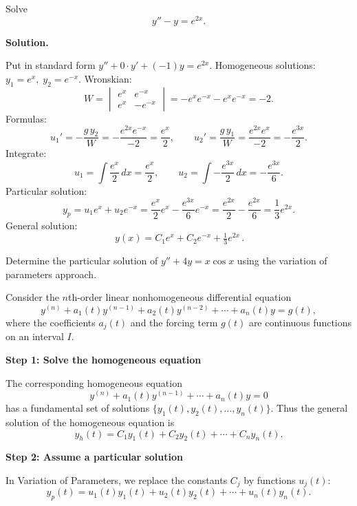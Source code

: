     \begin{example}

      Solve
      \[
        y''-y=e^{2x}.
      \]

      \textbf{Solution.} 
      
      Put in standard form $y''+0\cdot y'+(-1)y=e^{2x}$. Homogeneous solutions:
      $y_1=e^x,\; y_2=e^{-x}$. Wronskian:
      \[
        W=\begin{vmatrix}e^x & e^{-x}\\ e^x & -e^{-x}\end{vmatrix} = -e^x e^{-x} - e^x e^{-x} = -2.
      \]
      Formulas:
      \[
        u_1' = -\frac{g\,y_2}{W} = -\frac{e^{2x}e^{-x}}{-2} = \frac{e^x}{2},\qquad
        u_2' = \frac{g\,y_1}{W} = \frac{e^{2x}e^{x}}{-2} = -\frac{e^{3x}}{2}.
      \]
      Integrate:
      \[
        u_1 = \int \frac{e^x}{2}\,dx = \frac{e^x}{2},\qquad
        u_2 = \int -\frac{e^{3x}}{2}\,dx = -\frac{e^{3x}}{6}.
      \]
      Particular solution:
      \[
        y_p = u_1 e^x + u_2 e^{-x} = \frac{e^x}{2}e^x - \frac{e^{3x}}{6}e^{-x}
        = \frac{e^{2x}}{2} - \frac{e^{2x}}{6} = \frac{1}{3}e^{2x}.
      \]
      General solution:
      \[
        \boxed{\,y(x)=C_1 e^{x}+C_2 e^{-x} + \tfrac{1}{3}e^{2x}\,.}
      \]
    \end{example}


    \begin{example}
      Determine the particular solution of \(y'' + 4y = x\cos{x}\) using the variation of parameters approach.
    \end{example}


  Consider the $n$th-order linear nonhomogeneous differential equation
  \[
    y^{(n)} + a_{1}(t)y^{(n-1)} + a_{2}(t)y^{(n-2)} + \cdots + a_{n}(t)y = g(t),
  \]
  where the coefficients $a_{j}(t)$ and the forcing term $g(t)$ are continuous functions on an interval $I$.

  \textbf{Step 1: Solve the homogeneous equation}

  The corresponding homogeneous equation
  \[
    y^{(n)} + a_{1}(t)y^{(n-1)} + \cdots + a_{n}(t)y = 0
  \]
  has a fundamental set of solutions $\{y_{1}(t), y_{2}(t), \ldots, y_{n}(t)\}$.  
  Thus the general solution of the homogeneous equation is
  \[
    y_{h}(t) = C_{1}y_{1}(t) + C_{2}y_{2}(t) + \cdots + C_{n}y_{n}(t).
  \]

  \textbf{Step 2: Assume a particular solution}
  
  In Variation of Parameters, we replace the constants $C_{j}$ by functions $u_{j}(t)$:
  \[
    y_{p}(t) = u_{1}(t)y_{1}(t) + u_{2}(t)y_{2}(t) + \cdots + u_{n}(t)y_{n}(t).
  \]

